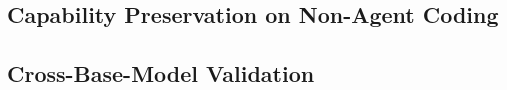 \documentclass{article}
\begin{document}
\subsection{Capability Preservation on Non-Agent Coding}
\label{sec:exp:gen}



%
%
%
%
\subsection{Cross-Base-Model Validation}
\label{sec:exp:crossbase}

\end{document}
